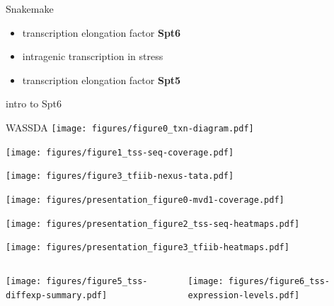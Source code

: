 \documentclass[aspectratio=169]{beamer}
\begin{document}
\begin{frame}{Snakemake}
\end{frame}

\begin{frame}
    \begin{itemize}[]
        \setlength{\itemsep}{1cm}
        \item transcription elongation factor \textbf{Spt6}
        \item intragenic transcription in stress
        \item transcription elongation factor \textbf{Spt5}
    \end{itemize}
\end{frame}

\begin{frame}{intro to Spt6}
\end{frame}

\begin{frame}{WASSDA}
\texttt{[image: figures/figure0\_txn-diagram.pdf]}
\end{frame}

\begin{frame}
\texttt{[image: figures/figure1\_tss-seq-coverage.pdf]}
\end{frame}

\begin{frame}
\texttt{[image: figures/figure3\_tfiib-nexus-tata.pdf]}
\end{frame}

\begin{frame}
\texttt{[image: figures/presentation\_figure0-mvd1-coverage.pdf]}
\end{frame}

\begin{frame}
\texttt{[image: figures/presentation\_figure2\_tss-seq-heatmaps.pdf]}
\end{frame}

\begin{frame}
\centering
\texttt{[image: figures/presentation\_figure3\_tfiib-heatmaps.pdf]}
\end{frame}

\begin{frame}
    \begin{columns}
        \begin{column}{0.5\textwidth}
            \centering
            \texttt{[image: figures/figure5\_tss-diffexp-summary.pdf]}
        \end{column}
        \begin{column}{0.5\textwidth}
            \centering
            \texttt{[image: figures/figure6\_tss-expression-levels.pdf]}
        \end{column}
    \end{columns}
\end{frame}
\end{document}
